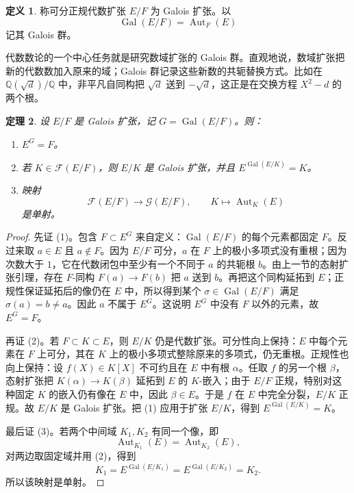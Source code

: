 \documentclass[11pt,a4paper,openany]{ctexbook}
\numberwithin{equation}{chapter}
\newcommand{\Q}{\mathbb{Q}}
\newcommand{\Gal}{\operatorname{Gal}}
\theoremstyle{plain}
\newtheorem{theorem}{定理}[chapter]
\theoremstyle{definition}
\newtheorem{definition}[theorem]{定义}
\theoremstyle{remark}
\begin{document}
\begin{definition}
称可分正规代数扩张 $E/F$ 为 Galois 扩张。以
\[
\Gal(E/F)=\operatorname{Aut}_F(E)
\]
记其 Galois 群。
\end{definition}

代数数论的一个中心任务就是研究数域扩张的 Galois 群。直观地说，数域扩张把新的代数数加入原来的域；Galois 群记录这些新数的共轭替换方式。比如在 $\Q(\sqrt d)/\Q$ 中，非平凡自同构把 $\sqrt d$ 送到 $-\sqrt d$，这正是在交换方程 $X^2-d$ 的两个根。

\begin{theorem}
设 $E/F$ 是 Galois 扩张，记 $G=\Gal(E/F)$。则：
\begin{enumerate}[label=(\arabic*)]
\item $E^G=F$。
\item 若 $K\in\mathcal F(E/F)$，则 $E/K$ 是 Galois 扩张，并且 $E^{\Gal(E/K)}=K$。
\item 映射
\[
\mathcal F(E/F)\longrightarrow\mathcal G(E/F),\qquad
K\longmapsto\operatorname{Aut}_K(E)
\]
是单射。
\end{enumerate}
\end{theorem}

\begin{proof}
先证 (1)。包含 $F\subset E^G$ 来自定义：$\Gal(E/F)$ 的每个元素都固定 $F$。反过来取 $a\in E$ 且 $a\notin F$。因为 $E/F$ 可分，$a$ 在 $F$ 上的极小多项式没有重根；因为次数大于 $1$，它在代数闭包中至少有一个不同于 $a$ 的共轭根 $b$。由上一节的态射扩张引理，存在 $F$-同构 $F(a)\to F(b)$ 把 $a$ 送到 $b$。再把这个同构延拓到 $E$；正规性保证延拓后的像仍在 $E$ 中，所以得到某个 $\sigma\in\Gal(E/F)$ 满足 $\sigma(a)=b\ne a$。因此 $a$ 不属于 $E^G$。这说明 $E^G$ 中没有 $F$ 以外的元素，故 $E^G=F$。

再证 (2)。若 $F\subset K\subset E$，则 $E/K$ 仍是代数扩张。可分性向上保持：$E$ 中每个元素在 $F$ 上可分，其在 $K$ 上的极小多项式整除原来的多项式，仍无重根。正规性也向上保持：设 $f(X)\in K[X]$ 不可约且在 $E$ 中有根 $\alpha$。任取 $f$ 的另一个根 $\beta$，态射扩张把 $K(\alpha)\to K(\beta)$ 延拓到 $E$ 的 $K$-嵌入；由于 $E/F$ 正规，特别对这种固定 $K$ 的嵌入仍有像在 $E$ 中，因此 $\beta\in E$。于是 $f$ 在 $E$ 中完全分裂，$E/K$ 正规。故 $E/K$ 是 Galois 扩张。把 (1) 应用于扩张 $E/K$，得到 $E^{\Gal(E/K)}=K$。

最后证 (3)。若两个中间域 $K_1,K_2$ 有同一个像，即
\[
\operatorname{Aut}_{K_1}(E)=\operatorname{Aut}_{K_2}(E),
\]
对两边取固定域并用 (2)，得到
\[
K_1=E^{\Gal(E/K_1)}=E^{\Gal(E/K_2)}=K_2.
\]
所以该映射是单射。
\end{proof}
\end{document}
